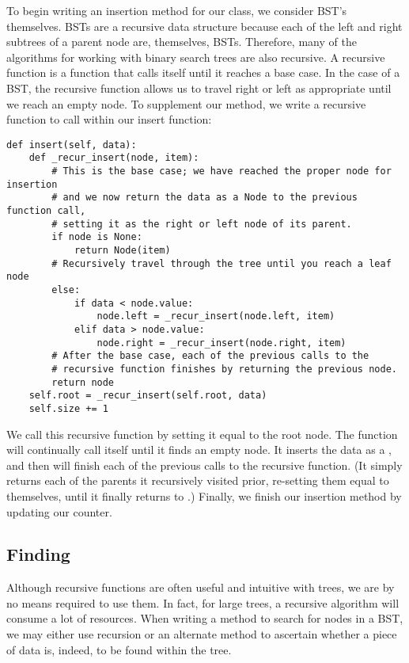 To begin writing an insertion method for our  class, we consider BST's themselves.
BSTs are a recursive data structure because each of the left and right subtrees of a parent node are, themselves, BSTs.
Therefore, many of the algorithms for working with binary search trees are also recursive.
A recursive function is a function that calls itself until it reaches a base case. In the case of a BST, the recursive function allows us to travel right or left as appropriate until we reach an empty node.
To supplement our  method, we write a recursive function to call within our insert function:
\begin{lstlisting}
def insert(self, data):
    def _recur_insert(node, item):
        # This is the base case; we have reached the proper node for insertion
        # and we now return the data as a Node to the previous function call,
        # setting it as the right or left node of its parent.
        if node is None:
            return Node(item)
        # Recursively travel through the tree until you reach a leaf node
        else:
            if data < node.value:
                node.left = _recur_insert(node.left, item)
            elif data > node.value:
                node.right = _recur_insert(node.right, item)
        # After the base case, each of the previous calls to the
        # recursive function finishes by returning the previous node.
        return node
    self.root = _recur_insert(self.root, data)
    self.size += 1
\end{lstlisting}
We call this recursive function by setting it equal to the root node.
The function will continually call itself until it finds an empty node. It inserts the data as a , and then  will finish each of the previous calls to the recursive function. 
(It simply returns each of the parents it recursively visited prior, re-setting them equal to themselves, until it finally returns to .)
Finally, we finish our insertion method by updating our counter.

\subsection*{Finding}
Although recursive functions are often useful and intuitive with trees, we  are by no means required to use them.
In fact, for large trees, a recursive algorithm will consume a lot of resources.
When writing a method to search for nodes in a BST, we may either use recursion or an alternate method to ascertain whether a piece of data is, indeed, to be found within the tree.

